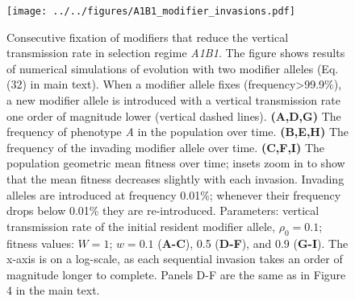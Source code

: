 \documentclass[]{article}
\begin{document}
\begin{figure}
\centering
\texttt{[image: ../../figures/A1B1\_modifier\_invasions.pdf]}
\caption{Consecutive fixation of modifiers that reduce the vertical
transmission rate in selection regime \emph{A1B1}. The figure shows
results of numerical simulations of evolution with two modifier alleles
(Eq. (32) in main text).
When a modifier allele fixes (frequency\textgreater{}99.9\%), a new modifier allele is introduced with a vertical transmission rate one order of magnitude lower (vertical
dashed lines). \textbf{(A,D,G)} The frequency of phenotype \emph{A} in
the population over time. \textbf{(B,E,H)} The frequency of the invading
modifier allele over time. \textbf{(C,F,I)} The population geometric mean
fitness over time; insets zoom in to show that the mean fitness 
decreases slightly with each invasion. 
Invading alleles are introduced at frequency 0.01\%; whenever their frequency drops below 0.01\% they are re-introduced.
Parameters: vertical transmission rate of
the initial resident modifier allele, \(\rho_0 =0.1\); fitness values:
$W=1$; $w=0.1$ (\textbf{A-C}), 0.5 (\textbf{D-F}), and 0.9
(\textbf{G-I}). The x-axis is on a log-scale, as each sequential invasion
takes an order of magnitude longer to complete.
Panels D-F are the same as in Figure 4 in the main text.
}\label{fig:A1B1_modifier_invasions}
\end{figure}
\end{document}
